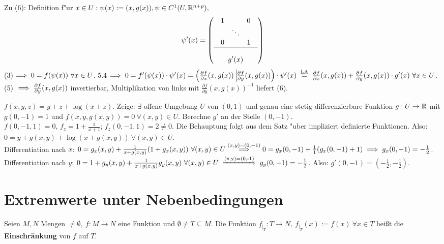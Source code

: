 \documentclass[a4paper,twoside,DIV15,BCOR12mm,chapterprefix=true,headings=twolinechapter]{scrbook}
\begin{document}
\begin{beweis}
Zu (6): Definition f"ur $x\in U: \psi(x):=(x,g(x)), \psi\in C^1(U,\mathbb{R}^{n+p}),$
$$\psi'(x)=\left(\begin{array}{c}
\begin{array}{ccc}
1 & & 0 \\
& \ddots & \\
0 & & 1 \\
\end{array}\\
\hline \\
\displaystyle{g'(x)}
\end{array}\right)$$
(3)$\implies 0=f(\psi(x))\ \forall x\in U$. 5.4$\folgt 0=f'(\psi(x))\cdot\psi'(x)=\left(\frac{\partial f}{\partial x}(x, g(x))\ \vline \frac{\partial f}{\partial y}(x, g(x))\right)\cdot\psi'(x)\gleichnach{LA}\frac{\partial f}{\partial x}(x, g(x)) + \frac{\partial f}{\partial y}(x, g(x))\cdot g'(x)\ \forall x\in U$. (5) $\implies \frac{\partial f}{\partial y}(x, g(x))$ invertierbar, Multiplikation von links mit $\frac{\partial f}{\partial y}(x, g(x))^{-1}$ liefert (6).
\end{beweis}

\begin{beispiel}
$f(x,y,z)=y+z+\log(x+z)$. Zeige: $\exists$ offene Umgebung $U$ von $(0,1)$ und genau eine stetig differenzierbare Funktion $g:U\to\mathbb{R}$ mit $g(0,-1)=1$ und $f(x,y,g(x,y))=0\ \forall (x,y)\in U$. Berechne $g'$ an der Stelle $(0,-1)$.\\
$f(0,-1,1)=0$, $f_z=1+\frac{1}{x+z}$; $f_z(0,-1,1)=2\ne 0$. Die Behauptung folgt aus dem Satz "uber impliziert definierte Funktionen. Also: $0=y+g(x,y)+\log(x+g(x,y))\ \forall (x,y)\in U$.\\
Differentiation nach $x$: $0=g_x(x,y)+\frac{1}{x+g(x,y)}(1+g_x(x,y))\ \forall (x,y)\in U\overset{(x,y)=(0,-1)}{\folgt}0=g_x(0,-1)+\frac{1}{1}(g_x(0,-1)+1)\folgt g_x(0,-1)=-\frac{1}{2}$.\\
Differentiation nach $y$: $0=1+g_y(x,y)+\frac{1}{x+g(x,y)}g_y(x,y)\ \forall (x,y)\in U \folgtnach{(x,y)=(0,-1)}g_y(0,-1)=-\frac{1}{2}$. Also: $g'(0,-1)=(-\frac{1}{2},-\frac{1}{2})$.
\end{beispiel}

\chapter{Extremwerte unter Nebenbedingungen}

\begin{definition}
Seien $M,N$ Mengen $\ne \emptyset,\ f:M\to N$ eine Funktion und $\emptyset \ne T \subseteq M$. Die Funktion $f_{|_T}: T \to N,\ f_{|_T}(x) := f(x)\ \forall x \in T$ heißt die \textbf{Einschränkung} von $f$ auf $T$.
\end{definition}
\end{document}
